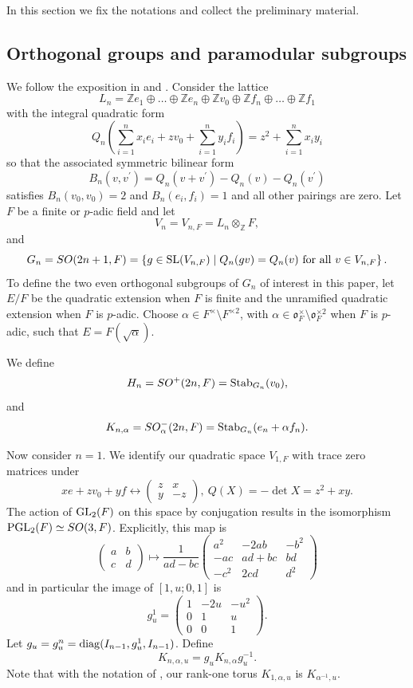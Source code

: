 \documentclass[12pt]{amsart}
\theoremstyle{definition}
\theoremstyle{remark}
\begin{document}
In this section we fix the notations and collect the preliminary material. 

\subsection{Orthogonal groups and paramodular subgroups}\label{ortho-para}

We follow the exposition in \cite[\S\S 3,5]{gro16} and \cite[\S 2]{che22}.
Consider the lattice 
\[L_n= \mathbb Z e_1 \oplus \dots \oplus \mathbb Z e_n \oplus \mathbb Z v_0 \oplus \mathbb Z f_n \oplus \dots \oplus \mathbb Z f_1 \]
with the integral quadratic form
\[
Q_n\left(\sum_{i=1}^{n}x_i e_i+zv_0+
       \sum_{i=1}^{n}y_i f_i\right)
=z^2+\sum_{i=1}^{n}x_i y_i
\]
so that the associated symmetric bilinear form
\[
B_n(v,v^\prime)=Q_n(v+v^\prime)-Q_n(v)-Q_n(v^\prime)
\]
satisfies $B_n(v_0,v_0)=2$ and $B_n(e_i,f_i)= 1$ and all other pairings are zero.
Let $F$ be a finite or $p$-adic field and let 
\[
V_n = V_{n,F}=L_n \otimes_{\mathbb Z} F,
\]
and 
\[
G_n = SO(2n+1,F)
=\left\{
g \in {\rm SL}(V_{n,F}) \mid
Q_n(gv)=Q_n(v)~ \text{for all }v\in V_{n,F}
\right\}.
\]
To define the two even orthogonal subgroups of $G_n$ of interest in this paper, let $E/F$ be the quadratic extension when $F$ is finite 
and the unramified quadratic extension when $F$ is $p$-adic. 
Choose $\alpha\in F^\times\setminus F^{\times2}$, with $\alpha\in\mathfrak o_F^\times \setminus \mathfrak o_F^{\times 2}$ when $F$ is $p$-adic, such that $E=F(\sqrt\alpha)$.

We define
\[H_n = SO^+(2n,F) = {\rm Stab}_{G_n}(v_0),\] and 
\[K_{n,\alpha} = SO_\alpha^-(2n,F) = {\rm Stab}_{G_n} (e_n+\alpha f_n).\]

Now consider $n=1$. We identify our quadratic space $V_{1,F}$ with trace zero matrices under 
\[xe+zv_0+yf \longleftrightarrow 
\left(\begin{array}{cc} z & x \\ y & -z \end{array} \right), ~Q(X) = -\det X = z^2+xy.
\]
The action of ${\rm GL}_2(F)$ on this space by conjugation results in the isomorphism ${\rm PGL}_2(F) \simeq SO(3,F)$. Explicitly, this map is
\[
\left( \begin{array}{cc} a & b \\ c & d \end{array}\right) \mapsto \frac{1}{ad-bc} \left( 
\begin{array}{ccc}
a^2 & -2ab & -b^2 \\ -ac & ad+bc & bd \\ -c^2 & 2cd & d^2 
\end{array}
\right)
\]
and in particular the image of $[1,u;0,1]$ is  
\[
g^1_u = \left(
\begin{array}{ccc}
1 & -2u & -u^2 \\ 0 & 1 & u \\ 0 & 0 & 1
\end{array}
\right).
\]
Let $g_u = g^n_u = {\rm diag}(I_{n-1},g^1_u,I_{n-1})$. Define
\begin{equation}\label{k-def}
K_{n,\alpha,u} = g_u K_{n,\alpha} g_u^{-1}.
\end{equation}
Note that with the notation of \cite{ana25}, our rank-one torus $K_{1,\alpha,u}$ is $K_{\alpha^{-1},u}$.
\end{document}
